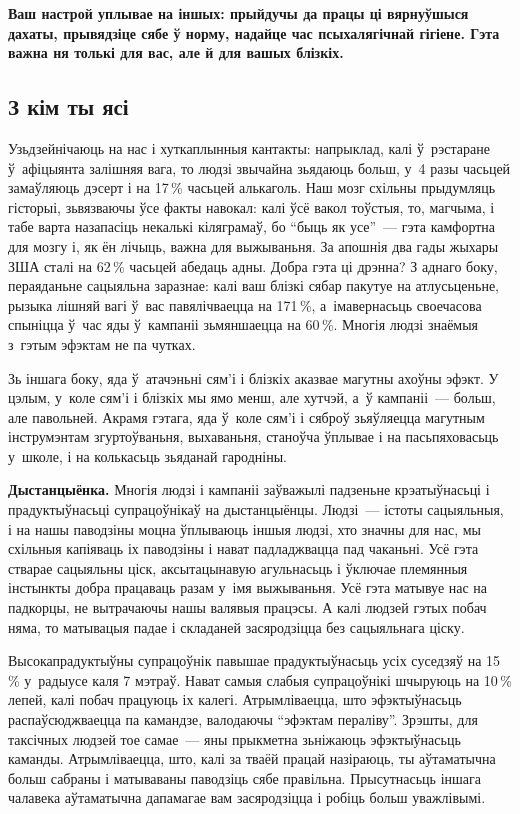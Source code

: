 \textbf{Ваш настрой уплывае на іншых: прыйдучы да працы ці вярнуўшыся дахаты, прывядзіце сябе ў норму, надайце час псыхалягічнай гігіене. Гэта важна ня толькі для вас, але й для вашых блізкіх.}

\subsection*{З кім ты ясі}

Узьдзейнічаюць на нас і хуткаплынныя кантакты: напрыклад, калі ў~рэстаране ў~афіцыянта залішняя вага, то людзі звычайна зьядаюць больш, у~4 разы часьцей замаўляюць дэсерт і на 17\,\% часьцей алькаголь. Наш мозг схільны прыдумляць гісторыі, зьвязваючы ўсе факты навокал: калі ўсё вакол тоўстыя, то, магчыма, і табе варта назапасіць некалькі кіляграмаў, бо ``быць як усе''~--- гэта камфортна для мозгу і, як ён лічыць, важна для выжываньня. За апошнія два гады жыхары ЗША сталі на 62\,\% часьцей абедаць адны. Добра гэта ці дрэнна? З аднаго боку, пераяданьне сацыяльна заразнае: калі ваш блізкі сябар пакутуе на атлусьценьне, рызыка лішняй вагі ў~вас павялічваецца на 171\,\%, а~імавернасьць своечасова спыніцца ў~час яды ў~кампаніі зьмяншаецца на 60\,\%. Многія людзі знаёмыя з~гэтым эфэктам не па чутках.


Зь іншага боку, яда ў~атачэньні сям'і і блізкіх аказвае магутны ахоўны эфэкт. У цэлым, у~коле сям'і і блізкіх мы ямо менш, але хутчэй, а~ў кампаніі~--- больш, але павольней. Акрамя гэтага, яда ў~коле сям'і і сяброў зьяўляецца магутным інструмэнтам згуртоўваньня, выхаваньня, станоўча ўплывае і на пасьпяховасьць у~школе, і на колькасьць зьяданай гародніны.

\textbf{Дыстанцыёнка.} Многія людзі і кампаніі заўважылі падзеньне крэатыўнасьці і прадуктыўнасьці супрацоўнікаў на дыстанцыёнцы. Людзі~--- істоты сацыяльныя, і на нашы паводзіны моцна ўплываюць іншыя людзі, хто значны для нас, мы схільныя капіяваць іх паводзіны і нават падладжвацца пад чаканьні. Усё гэта стварае сацыяльны ціск, аксытацынавую агульнасьць і ўключае племянныя інстынкты добра працаваць разам у~імя выжываньня. Усё гэта матывуе нас на падкорцы, не вытрачаючы нашы валявыя працэсы. А калі людзей гэтых побач няма, то матывацыя падае і складаней засяродзіцца без сацыяльнага ціску.

Высокапрадуктыўны супрацоўнік павышае прадуктыўнасьць усіх суседзяў на 15\,\% у~радыусе каля 7 мэтраў. Нават самыя слабыя супрацоўнікі шчыруюць на 10\,\% лепей, калі побач працуюць іх калегі. Атрымліваецца, што эфэктыўнасьць распаўсюджваецца па камандзе, валодаючы ``эфэктам пераліву''. Зрэшты, для таксічных людзей тое самае~--- яны прыкметна зьніжаюць эфэктыўнасьць каманды. Атрымліваецца, што, калі за тваёй працай назіраюць, ты аўтаматычна больш сабраны і матываваны паводзіць сябе правільна. Прысутнасьць іншага чалавека аўтаматычна дапамагае вам засяродзіцца і робіць больш уважлівымі.

